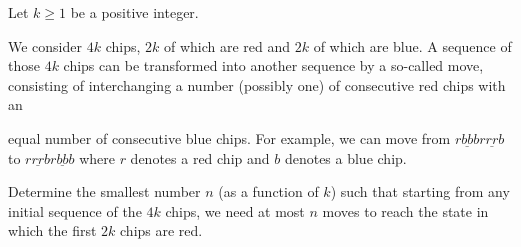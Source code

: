 Let $k\ge 1$ be a positive integer.

We consider $4k$ chips, $2k$ of which are red and $2k$ of which are blue. A sequence of those $4k$ chips can be transformed into another sequence by a so-called move, consisting of interchanging a number (possibly one) of consecutive red chips with an

equal number of consecutive blue chips.  For example, we can move from $r\underline{bb}br\underline{rr}b$ to $r\underline{rr}br\underline{bb}b$ where $r$ denotes a red chip and $b$ denotes a blue chip.

Determine the smallest number $n$ (as a function of $k$) such that starting from any initial sequence of the $4k$ chips, we need at most $n$ moves to reach the state in which the first $2k$ chips are red.
